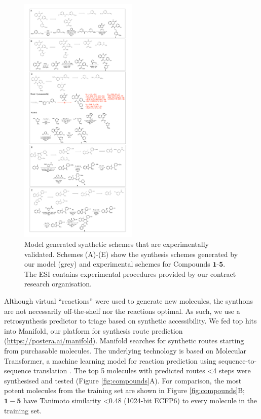 \begin{figure}
\centering
         \includegraphics[width=0.5\textwidth]{Chapters/Ranking/Figs/aaron_schemes.pdf}
    \caption{Model generated synthetic schemes that are experimentally validated. Schemes (A)-(E) show the synthesis schemes generated by our model (grey) and experimental schemes for Compounds $\mathbf{1}$-$\mathbf{5}$. The ESI contains experimental procedures provided by our contract research organisation.}
    \label{fig:synthesis_schemes}
\end{figure}

Although virtual ``reactions'' were used to generate new molecules, the synthons are not necessarily off-the-shelf nor the reactions optimal. As such, we use a retrosynthesis predictor to triage based on synthetic accessibility. We fed top hits into Manifold, our platform for synthesis route prediction (\url{https://postera.ai/manifold}). Manifold searches for synthetic routes starting from purchasable molecules. The underlying technology is based on Molecular Transformer, a machine learning model for reaction prediction using sequence-to-sequence translation \citep{yang2019molecular,schwaller2019molecular}. The top 5 molecules with predicted routes <4 steps were synthesised and tested (Figure \ref{fig:compounds}A). For comparison, the most potent molecules from the training set are shown in Figure \ref{fig:compounds}B; $\mathbf{1}-\mathbf{5}$ have Tanimoto similarity <0.48 (1024-bit ECFP6) to every molecule in the training set. 

